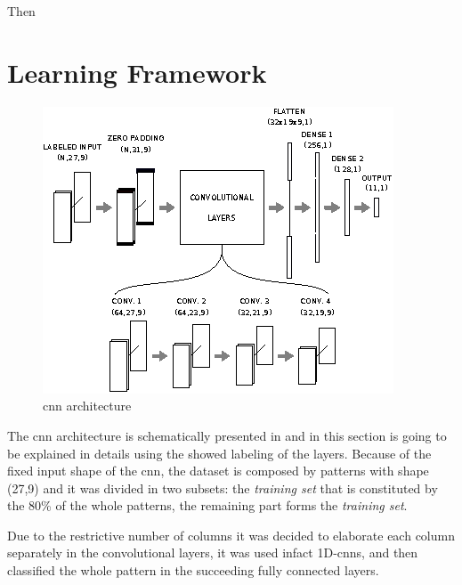 Then 



\section{Learning Framework}
\label{sec:learning_framework}

\begin{figure}[htp]
\includegraphics[scale=1.75]{CNN_arch.eps}
\caption{\gls{cnn} architecture}
\label{fig:CNN}
\end{figure}



The \gls{cnn} architecture is schematically presented in  and in this section is going to be explained in details using the showed labeling of the layers. 
Because of the fixed input shape of the \gls{cnn}, the dataset is composed by  patterns with shape (27,9) and it was divided in two subsets: the \textit{training set} that is constituted by the 80\% of the whole patterns, the remaining part forms the \textit{training set}.

Due to the restrictive number of columns it was decided to elaborate each column separately in the convolutional layers, it was used infact 1D-\glspl{cnn}, and then classified the whole pattern in the succeeding fully connected layers. 

